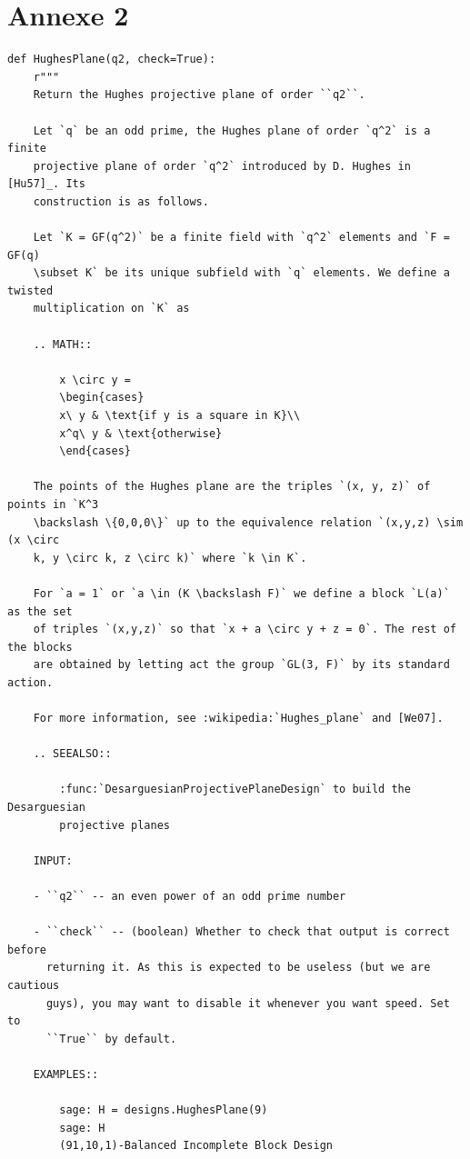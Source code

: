 \documentclass[a4paper]{article}
\begin{document}
\section*{Annexe 2}
\begin{lstlisting}
def HughesPlane(q2, check=True):
    r"""
    Return the Hughes projective plane of order ``q2``.

    Let `q` be an odd prime, the Hughes plane of order `q^2` is a finite
    projective plane of order `q^2` introduced by D. Hughes in [Hu57]_. Its
    construction is as follows.

    Let `K = GF(q^2)` be a finite field with `q^2` elements and `F = GF(q)
    \subset K` be its unique subfield with `q` elements. We define a twisted
    multiplication on `K` as

    .. MATH::

        x \circ y =
        \begin{cases}
        x\ y & \text{if y is a square in K}\\
        x^q\ y & \text{otherwise}
        \end{cases}

    The points of the Hughes plane are the triples `(x, y, z)` of points in `K^3
    \backslash \{0,0,0\}` up to the equivalence relation `(x,y,z) \sim (x \circ
    k, y \circ k, z \circ k)` where `k \in K`.

    For `a = 1` or `a \in (K \backslash F)` we define a block `L(a)` as the set
    of triples `(x,y,z)` so that `x + a \circ y + z = 0`. The rest of the blocks
    are obtained by letting act the group `GL(3, F)` by its standard action.

    For more information, see :wikipedia:`Hughes_plane` and [We07].

    .. SEEALSO::

        :func:`DesarguesianProjectivePlaneDesign` to build the Desarguesian
        projective planes

    INPUT:

    - ``q2`` -- an even power of an odd prime number

    - ``check`` -- (boolean) Whether to check that output is correct before
      returning it. As this is expected to be useless (but we are cautious
      guys), you may want to disable it whenever you want speed. Set to
      ``True`` by default.

    EXAMPLES::

        sage: H = designs.HughesPlane(9)
        sage: H
        (91,10,1)-Balanced Incomplete Block Design


\end{lstlisting}
\end{document}
